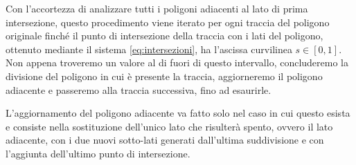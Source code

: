 \documentclass[a4paper]{article}
\begin{document}
Con l'accortezza di analizzare tutti i poligoni adiacenti al lato di prima intersezione, questo procedimento viene iterato per ogni traccia del poligono originale finché il punto di intersezione della traccia con i lati del poligono, ottenuto mediante il sistema \eqref{eq:intersezioni}, ha l'ascissa curvilinea $s \in [0,1]$. Non appena troveremo un valore al di fuori di questo intervallo, concluderemo la divisione del poligono in cui è presente la traccia, aggiorneremo il poligono adiacente e passeremo alla traccia successiva, fino ad esaurirle.

L'aggiornamento del poligono adiacente va fatto solo nel caso in cui questo esista e consiste nella sostituzione dell'unico lato che risulterà spento, ovvero il lato adiacente, con i due nuovi sotto-lati generati dall'ultima suddivisione e con l'aggiunta dell'ultimo punto di intersezione.
\end{document}
